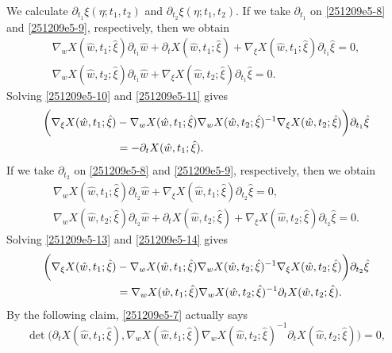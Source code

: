 \documentclass{article}
\numberwithin{equation}{section}
\theoremstyle{plain}
\begin{document}
We calculate $\partial_{t_1} \xi(\eta; t_1, t_2)$ and $\partial_{t_2} \xi(\eta; t_1, t_2)$. If we take $\partial_{t_1}$ on \eqref{251209e5-8} and \eqref{251209e5-9}, respectively, then we obtain
\begin{align}
    \nabla_w X(\hat{w},t_1;\hat{\xi})\partial_{t_1}\hat{w}+ \partial_t X(\hat{w},t_1;\hat{\xi})+ \nabla_\xi X(\hat{w},t_1;\hat{\xi})\partial_{t_1}\hat{\xi}=0, \label{251209e5-10}\\
    \nabla_w X(\hat{w},t_2;\hat{\xi})\partial_{t_1}\hat{w}+ \nabla_\xi X(\hat{w},t_2;\hat{\xi})\partial_{t_1}\hat{\xi}=0.\quad\quad\qquad\qquad\ \ \label{251209e5-11}
\end{align}
Solving \eqref{251209e5-10} and \eqref{251209e5-11} gives
\begin{align}\label{251209e5-12}
    \bigg(\nabla_\xi X(\hat{w},t_1;\hat{\xi})&- \nabla_w X(\hat{w},t_1;\hat{\xi}) \nabla_w X(\hat{w},t_2;\hat{\xi})^{-1} \nabla_\xi X(\hat{w},t_2;\hat{\xi})\bigg)\partial_{t_1}\hat{\xi} \notag\\
    &=-\partial_t X(\hat{w},t_1;\hat{\xi}).
\end{align}
If we take $\partial_{t_2}$ on \eqref{251209e5-8} and \eqref{251209e5-9}, respectively, then we obtain
\begin{align}
    \nabla_w X(\hat{w},t_1;\hat{\xi})\partial_{t_2}\hat{w}+ \nabla_\xi X(\hat{w},t_1;\hat{\xi})\partial_{t_2}\hat{\xi}=0, \quad\quad\qquad\qquad\ \ \label{251209e5-13}\\
    \nabla_w X(\hat{w},t_2;\hat{\xi})\partial_{t_2}\hat{w}+ \partial_t X(\hat{w},t_2;\hat{\xi})+ \nabla_\xi X(\hat{w},t_2;\hat{\xi})\partial_{t_2}\hat{\xi}=0. \label{251209e5-14}
\end{align}
Solving \eqref{251209e5-13} and \eqref{251209e5-14} gives
\begin{align}
    \bigg(\nabla_\xi X(\hat{w},t_1;\hat{\xi})&- \nabla_w X(\hat{w},t_1;\hat{\xi}) \nabla_w X(\hat{w},t_2;\hat{\xi})^{-1} \nabla_\xi X(\hat{w},t_2;\hat{\xi})\bigg)\partial_{t_2}\hat{\xi} \notag\\
    &= \nabla_w X(\hat{w},t_1;\hat{\xi}) \nabla_w X(\hat{w},t_2;\hat{\xi})^{-1}\partial_t X(\hat{w},t_2;\hat{\xi}).
\end{align}
By the following claim, \eqref{251209e5-7} actually says
\begin{equation}\label{251209e5-16}
    \det\big( \partial_t X(\hat{w},t_1;\hat{\xi}), \nabla_w X(\hat{w},t_1;\hat{\xi}) \nabla_w X(\hat{w},t_2;\hat{\xi})^{-1}\partial_t X(\hat{w},t_2;\hat{\xi}) \big)=0,
\end{equation}
\end{document}
